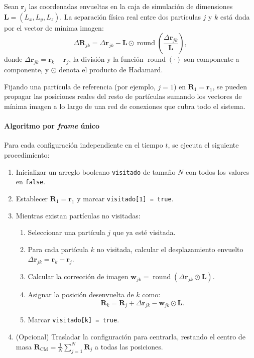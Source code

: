 \documentclass{tufte-handout}
\begin{document}
Sean $\mathbf{r}_j$ las coordenadas envueltas en la caja de simulación de dimensiones $\mathbf{L} = (L_x, L_y, L_z)$. La separación física real entre dos partículas $j$ y $k$ está dada por el vector de mínima imagen:
\begin{equation}
\Delta \mathbf{R}_{jk} = \Delta \mathbf{r}_{jk} - \mathbf{L} \odot \operatorname{round}\left( \frac{\Delta \mathbf{r}_{jk}}{\mathbf{L}} \right),
\end{equation}
donde $\Delta \mathbf{r}_{jk} = \mathbf{r}_k - \mathbf{r}_j$, la división y la función $\operatorname{round}(\cdot)$ son componente a componente, y $\odot$ denota el producto de Hadamard.

Fijando una partícula de referencia (por ejemplo, $j=1$) en $\mathbf{R}_1 = \mathbf{r}_1$, se pueden propagar las posiciones reales del resto de partículas sumando los vectores de mínima imagen a lo largo de una red de conexiones que cubra todo el sistema.

\paragraph*{Algoritmo por \textit{frame} único}

Para cada configuración independiente en el tiempo $t$, se ejecuta el siguiente procedimiento:
\begin{enumerate}
    \item Inicializar un arreglo booleano \texttt{visitado} de tamaño $N$ con todos los valores en \texttt{false}.
    \item Establecer $\mathbf{R}_1 = \mathbf{r}_1$ y marcar \texttt{visitado[1] = true}.
    \item Mientras existan partículas no visitadas:
    \begin{enumerate}
        \item Seleccionar una partícula $j$ que ya esté visitada.
        \item Para cada partícula $k$ no visitada, calcular el desplazamiento envuelto $\Delta \mathbf{r}_{jk} = \mathbf{r}_k - \mathbf{r}_j$.
        \item Calcular la corrección de imagen $\mathbf{w}_{jk} = \operatorname{round}(\Delta \mathbf{r}_{jk} \oslash \mathbf{L})$.
        \item Asignar la posición desenvuelta de $k$ como:
        \begin{equation}
            \mathbf{R}_k = \mathbf{R}_j + \Delta \mathbf{r}_{jk} - \mathbf{w}_{jk} \odot \mathbf{L}.
        \end{equation}
        \item Marcar \texttt{visitado[k] = true}.
    \end{enumerate}
    \item (Opcional) Trasladar la configuración para centrarla, restando el centro de masa $\mathbf{R}_{\text{CM}} = \frac{1}{N} \sum_{j=1}^N \mathbf{R}_j$ a todas las posiciones.
\end{enumerate}
\end{document}
